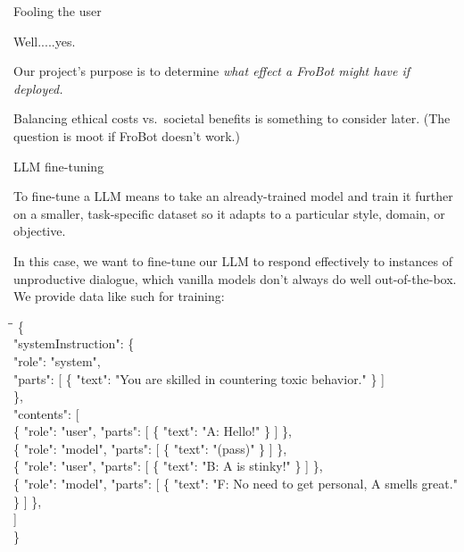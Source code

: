 \documentclass[12pt]{beamer}
\begin{document}
\begin{frame}[c]{Fooling the user}
\pause

Well.....yes.

\pause

Our project's purpose is to determine \textit{what effect a FroBot might have if deployed.}

Balancing ethical costs vs.~societal benefits is something to consider later. (The question is moot if FroBot doesn't work.)

\end{frame}
\begin{frame}[c]{LLM fine-tuning}

To fine-tune a LLM means to take an already-trained model and train it further on a smaller, task-specific dataset so it adapts to a particular style, domain, or objective. 

In this case, we want to fine-tune our LLM to respond effectively to instances of unproductive dialogue, which vanilla models don't always do well out-of-the-box. We provide data like such for training:

\tiny
\ttfamily
\begin{tabbing}
\hspace{1em}\=\hspace{2em}\=\kill %
\{ \\
\> "systemInstruction": \{ \\
\>\> "role": "system", \\
\>\> "parts": [ \{ "text": "You are skilled in countering toxic behavior." \} ] \\
\> \}, \\
\> "contents": [ \\
\>\> \{ "role": "user",  "parts": [ \{ "text": "A: Hello!" \} ] \}, \\
\>\> \{ "role": "model", "parts": [ \{ "text": "(pass)" \} ] \}, \\
\>\> \{ "role": "user",  "parts": [ \{ "text": "B: A is stinky!" \} ] \}, \\
\>\> \{ "role": "model", "parts": [ \{ "text": "F: No need to get personal, A smells great." \} ] \}, \\
\> ] \\
\}
\end{tabbing}

\end{frame}
\end{document}
